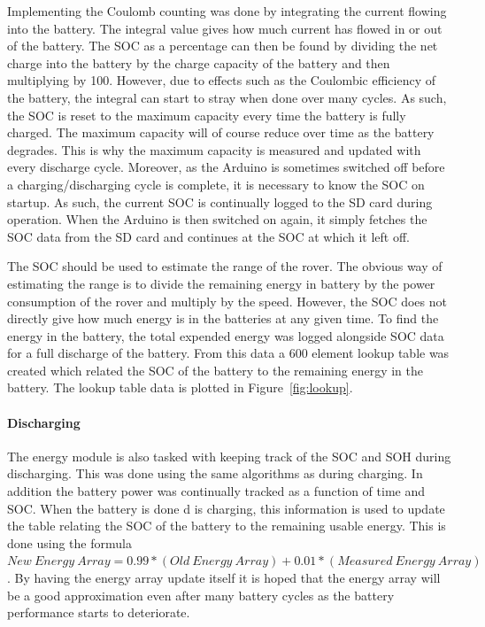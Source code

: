 \documentclass[a4paper]{article}
\begin{document}
Implementing the Coulomb counting was done by integrating the current 
flowing into the battery. The integral value gives how much current 
has flowed in or out of the battery. The SOC as a percentage can 
then be found by dividing the net charge into the battery by the charge 
capacity of the battery and then multiplying by 100. However, due to
effects such as the Coulombic efficiency of the battery, the 
integral can start to stray when done over many cycles. As such, 
the SOC is reset to the maximum capacity every time the battery is 
fully charged. The maximum capacity will of course reduce over 
time as the battery degrades. This is why the maximum capacity is 
measured and updated with every discharge cycle. Moreover, as the 
Arduino is sometimes switched off before a charging/discharging 
cycle is complete, it is necessary to know the SOC on startup. 
As such, the current SOC is continually logged to the SD card during 
operation. When the Arduino is then switched on again, it simply 
fetches the SOC data from the SD card and continues at the SOC at 
which it left off. 

The SOC should be used to estimate the range of the rover. The 
obvious way of estimating the range is to divide the remaining energy 
in battery by the power consumption of the rover and multiply by 
the speed. However, the SOC does not directly give how much energy 
is in the batteries at any given time. To find the energy in the 
battery, the total expended energy was logged alongside SOC data 
for a full discharge of the battery. From this data a 600 element 
lookup table was created which related the SOC of the battery to 
the remaining energy in the battery. The lookup table data is plotted 
in Figure~\ref{fig:lookup}.

\paragraph*{Discharging}
The energy module is also tasked with keeping track of the SOC and SOH 
during discharging. This was done using the same algorithms as 
during charging. In addition the battery power was continually 
tracked as a function of time and SOC. When the battery is done d
is charging, this information is used to update the table relating the 
SOC of the battery to the remaining usable energy. This is done using 
the formula 
\( New~Energy~Array = 0.99*(Old~Energy~Array) + 0.01*(Measured~Energy~Array) \). 
By having the energy array update itself it is hoped that the energy 
array will be a good approximation even after many battery cycles 
as the battery performance starts to deteriorate.
\end{document}
